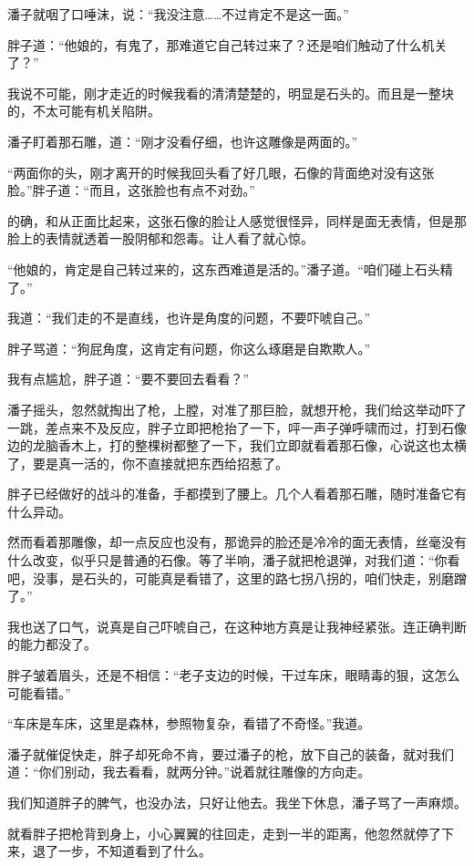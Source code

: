 潘子就咽了口唾沫，说：“我没注意……不过肯定不是这一面。”

胖子道：“他娘的，有鬼了，那难道它自己转过来了？还是咱们触动了什么机关了？”

我说不可能，刚才走近的时候我看的清清楚楚的，明显是石头的。而且是一整块的，不太可能有机关陷阱。

潘子盯着那石雕，道：“刚才没看仔细，也许这雕像是两面的。”

“两面你的头，刚才离开的时候我回头看了好几眼，石像的背面绝对没有这张脸。”胖子道：“而且，这张脸也有点不对劲。”

的确，和从正面比起来，这张石像的脸让人感觉很怪异，同样是面无表情，但是那脸上的表情就透着一股阴郁和怨毒。让人看了就心惊。

“他娘的，肯定是自己转过来的，这东西难道是活的。”潘子道。“咱们碰上石头精了。”

我道：“我们走的不是直线，也许是角度的问题，不要吓唬自己。”

胖子骂道：“狗屁角度，这肯定有问题，你这么琢磨是自欺欺人。”

我有点尴尬，胖子道：“要不要回去看看？”

潘子摇头，忽然就掏出了枪，上膛，对准了那巨脸，就想开枪，我们给这举动吓了一跳，差点来不及反应，胖子立即把枪抬了一下，呯一声子弹呼啸而过，打到石像边的龙脑香木上，打的整棵树都整了一下，我们立即就看着那石像，心说这也太横了，要是真一活的，你不直接就把东西给招惹了。

胖子已经做好的战斗的准备，手都摸到了腰上。几个人看着那石雕，随时准备它有什么异动。

然而看着那雕像，却一点反应也没有，那诡异的脸还是冷冷的面无表情，丝毫没有什么改变，似乎只是普通的石像。等了半响，潘子就把枪退弹，对我们道：“你看吧，没事，是石头的，可能真是看错了，这里的路七拐八拐的，咱们快走，别磨蹭了。”

我也送了口气，说真是自己吓唬自己，在这种地方真是让我神经紧张。连正确判断的能力都没了。

胖子皱着眉头，还是不相信：“老子支边的时候，干过车床，眼睛毒的狠，这怎么可能看错。”

“车床是车床，这里是森林，参照物复杂，看错了不奇怪。”我道。

潘子就催促快走，胖子却死命不肯，要过潘子的枪，放下自己的装备，就对我们道：“你们别动，我去看看，就两分钟。”说着就往雕像的方向走。

我们知道胖子的脾气，也没办法，只好让他去。我坐下休息，潘子骂了一声麻烦。

就看胖子把枪背到身上，小心翼翼的往回走，走到一半的距离，他忽然就停了下来，退了一步，不知道看到了什么。

